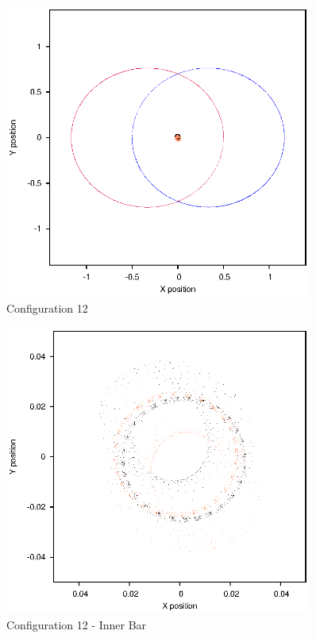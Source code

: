 \documentclass[a4paper,12pt]{article}
\begin{document}
\begin{figure}[H]
\centering
\includegraphics[width=0.9\textwidth]{./2017results/025-7-025-5/Orbit.eps}
\caption{Configuration 12}
\label{fig:config12}
\end{figure}
\begin{figure}[H]
\centering
\includegraphics[width=0.9\textwidth]{./2017results/025-7-025-5/Inner.eps}
\caption{Configuration 12 - Inner Bar}
\label{fig:config12i}
\end{figure}
\end{document}
